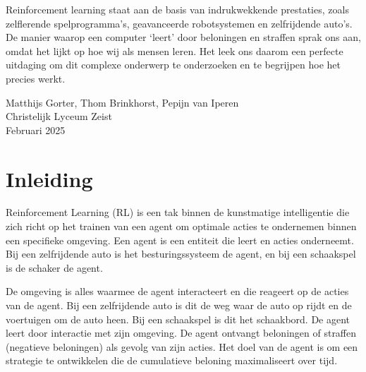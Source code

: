 \documentclass[a4paper,11pt]{report}
\begin{document}
Reinforcement learning staat aan de basis van indrukwekkende prestaties, zoals
zelflerende spelprogramma’s, geavanceerde robotsystemen en zelfrijdende auto’s.
De manier waarop een computer ‘leert’ door beloningen en straffen sprak ons
aan, omdat het lijkt op hoe wij als mensen leren. Het leek ons daarom een
perfecte uitdaging om dit complexe onderwerp te onderzoeken en te begrijpen hoe
het precies werkt.

Matthijs Gorter, Thom Brinkhorst, Pepijn van Iperen \\ Christelijk Lyceum Zeist
\\ Februari 2025

\tableofcontents
\newpage
{}  %

\newpage

\chapter{Inleiding}
Reinforcement Learning (RL) is een tak binnen de kunstmatige intelligentie die
zich richt op het trainen van een agent om optimale acties te ondernemen binnen
een specifieke omgeving. Een agent is een entiteit die leert en acties
onderneemt. Bij een zelfrijdende auto is het besturingssysteem de agent, en bij
een schaakspel is de schaker de agent.

\noindent
\begin{minipage}[t]{0.65\textwidth}
    \vspace{-6.5\baselineskip}
    De omgeving is alles waarmee de agent interacteert en die reageert op de acties van
    de agent. Bij een zelfrijdende auto is dit de weg waar de auto op rijdt en de
    voertuigen om de auto heen. Bij een schaakspel is dit het schaakbord. De agent
    leert door interactie met zijn omgeving. De agent ontvangt beloningen of
    straffen (negatieve beloningen) als gevolg van zijn acties. Het doel van de
    agent is om een strategie te ontwikkelen die de cumulatieve beloning
    maximaliseert over tijd.
\end{minipage}
\hfill %
\begin{minipage}[t]{0.3\textwidth} %
    \centering
    \label{fig:rl_model}
\end{minipage}
\end{document}
